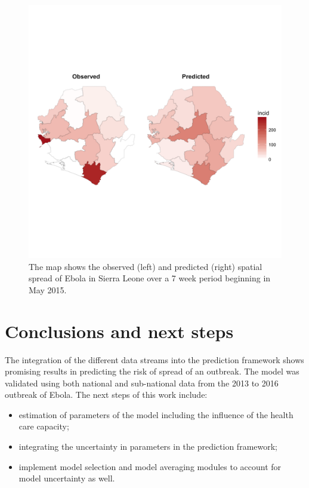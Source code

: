 \documentclass[11pt,]{article}
\begin{document}
\begin{figure}
  \centering
  \includegraphics{ms6-figures/sl-map}
  \caption[Spatial spread of Ebola in Sierra Leone]{The map shows the
    observed (left) and predicted (right) spatial spread of Ebola in
    Sierra Leone over a 7 week period beginning in May 2015.}
  \label{fig:sl-map}
\end{figure}
\FloatBarrier

\section{Conclusions and next steps}\label{sec:conclusions}

The integration of the different data streams into the prediction
framework shows promising results in predicting the risk of spread of
an outbreak. The model was validated using both national and
sub-national data from the  2013 to 2016 outbreak of Ebola. The next
steps of this work include:

\begin{itemize}
\item estimation of parameters of the model including the influence of
  the health care capacity;
\item integrating the uncertainty in parameters in the prediction
  framework;
\item implement model selection and model averaging modules to account
  for model uncertainty as well.
\end{itemize}
\end{document}
